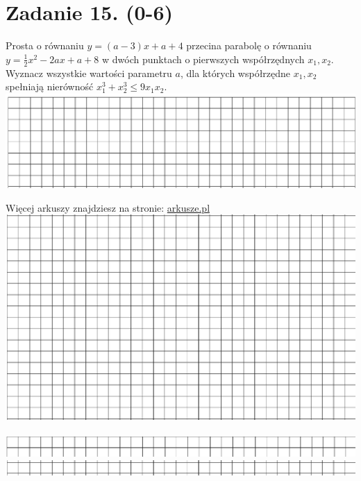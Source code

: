 \documentclass[10pt]{article}
\begin{document}
\section*{Zadanie 15. (0-6)}
Prosta o równaniu \(y=(a-3) x+a+4\) przecina parabolę o równaniu \(y=\frac{1}{2} x^{2}-2 a x+a+8\) w dwóch punktach o pierwszych współrzędnych \(x_{1}, x_{2}\). Wyznacz wszystkie wartości parametru \(a\), dla których współrzędne \(x_{1}, x_{2}\) spełniają nierówność \(x_{1}^{3}+x_{2}^{3} \leqslant 9 x_{1} x_{2}\).\\
\includegraphics[max width=\textwidth, center]{2024_11_21_f29375993e8c629c464fg-18(4)}

Więcej arkuszy znajdziesz na stronie: \href{http://arkusze.pl}{arkusze.pl}\\
\includegraphics[max width=\textwidth, center]{2024_11_21_f29375993e8c629c464fg-18(5)}\\
\(\qquad\)\\
\includegraphics[max width=\textwidth, center]{2024_11_21_f29375993e8c629c464fg-18(2)}\\
\includegraphics[max width=\textwidth, center]{2024_11_21_f29375993e8c629c464fg-18}
\end{document}

